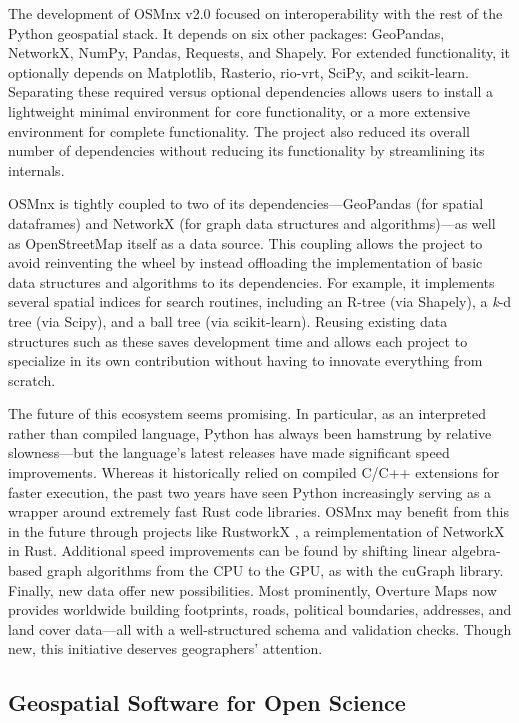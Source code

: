 \documentclass[12pt,letterpaper]{article} %
\begin{document}
The development of OSMnx v2.0 focused on interoperability with the rest of the Python geospatial stack. It depends on six other packages: GeoPandas, NetworkX, NumPy, Pandas, Requests, and Shapely. For extended functionality, it optionally depends on Matplotlib, Rasterio, rio-vrt, SciPy, and scikit-learn. Separating these required versus optional dependencies allows users to install a lightweight minimal environment for core functionality, or a more extensive environment for complete functionality. The project also reduced its overall number of dependencies without reducing its functionality by streamlining its internals.

OSMnx is tightly coupled to two of its dependencies---GeoPandas (for spatial dataframes) and NetworkX (for graph data structures and algorithms)---as well as OpenStreetMap itself as a data source. This coupling allows the project to avoid reinventing the wheel by instead offloading the implementation of basic data structures and algorithms to its dependencies. For example, it implements several spatial indices for search routines, including an R-tree (via Shapely), a \textit{k}-d tree (via Scipy), and a ball tree (via scikit-learn). Reusing existing data structures such as these saves development time and allows each project to specialize in its own contribution without having to innovate everything from scratch.

The future of this ecosystem seems promising. In particular, as an interpreted rather than compiled language, Python has always been hamstrung by relative slowness---but the language's latest releases have made significant speed improvements. Whereas it historically relied on compiled C/C++ extensions for faster execution, the past two years have seen Python increasingly serving as a wrapper around extremely fast Rust code libraries. OSMnx may benefit from this in the future through projects like RustworkX \citep{Treinish2022}, a reimplementation of NetworkX in Rust. Additional speed improvements can be found by shifting linear algebra-based graph algorithms from the CPU to the GPU, as with the cuGraph library. Finally, new data offer new possibilities. Most prominently, Overture Maps now provides worldwide building footprints, roads, political boundaries, addresses, and land cover data---all with a well-structured schema and validation checks. Though new, this initiative deserves geographers' attention.

\subsection{Geospatial Software for Open Science}
\end{document}
